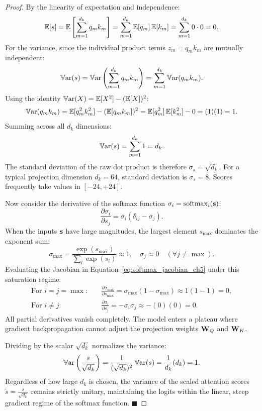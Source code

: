 \documentclass[../../main.tex]{subfiles}
\begin{document}
\begin{proof}
By the linearity of expectation and independence:
\begin{equation}
\operatorname*{\mathbb{E}}[s] = \operatorname*{\mathbb{E}}\left[ \sum_{m=1}^{d_k} q_m k_m \right] = \sum_{m=1}^{d_k} \operatorname*{\mathbb{E}}[q_m] \operatorname*{\mathbb{E}}[k_m] = \sum_{m=1}^{d_k} 0 \cdot 0 = 0.
\end{equation}
For the variance, since the individual product terms $z_m = q_m k_m$ are mutually independent:
\begin{equation}
\operatorname{\mathbb{V}\mathrm{ar}}(s) = \operatorname{\mathbb{V}\mathrm{ar}}\left( \sum_{m=1}^{d_k} q_m k_m \right) = \sum_{m=1}^{d_k} \operatorname{\mathbb{V}\mathrm{ar}}(q_m k_m).
\end{equation}
Using the identity $\operatorname{\mathbb{V}\mathrm{ar}}(X) = \operatorname*{\mathbb{E}}[X^2] - (\operatorname*{\mathbb{E}}[X])^2$:
\begin{equation}
\operatorname{\mathbb{V}\mathrm{ar}}(q_m k_m) = \operatorname*{\mathbb{E}}[q_m^2 k_m^2] - (\operatorname*{\mathbb{E}}[q_m k_m])^2 = \operatorname*{\mathbb{E}}[q_m^2] \operatorname*{\mathbb{E}}[k_m^2] - 0 = (1)(1) = 1.
\end{equation}
Summing across all $d_k$ dimensions:
\begin{equation}
\operatorname{\mathbb{V}\mathrm{ar}}(s) = \sum_{m=1}^{d_k} 1 = d_k.
\end{equation}
The standard deviation of the raw dot product is therefore $\sigma_s = \sqrt{d_k}$. For a typical projection dimension $d_k = 64$, standard deviation is $\sigma_s = 8$. Scores frequently take values in $[-24, +24]$.

Now consider the derivative of the softmax function $\sigma_i = \operatorname{\mathrm{softmax}}_i(\mathbf{s})$:
\begin{equation}
\label{eq:softmax_jacobian_ch5}
\frac{\partial \sigma_i}{\partial s_j} = \sigma_i (\delta_{ij} - \sigma_j).
\end{equation}
When the inputs $\mathbf{s}$ have large magnitudes, the largest element $s_{\max}$ dominates the exponent sum:
\begin{equation}
\sigma_{\max} = \frac{\exp(s_{\max})}{\sum_l \exp(s_l)} \approx 1, \quad \sigma_{j} \approx 0 \quad (\forall j \neq \max).
\end{equation}
Evaluating the Jacobian in Equation~\eqref{eq:softmax_jacobian_ch5} under this saturation regime:
\begin{align}
\text{For } i = j = \max: \quad &\frac{\partial \sigma_{\max}}{\partial s_{\max}} = \sigma_{\max}(1 - \sigma_{\max}) \approx 1(1 - 1) = 0, \\
\text{For } i \neq j: \quad &\frac{\partial \sigma_i}{\partial s_j} = -\sigma_i \sigma_j \approx -(0)(0) = 0.
\end{align}
All partial derivatives vanish completely. The model enters a plateau where gradient backpropagation cannot adjust the projection weights $\mathbf{W}_Q$ and $\mathbf{W}_K$.

Dividing by the scalar $\sqrt{d_k}$ normalizes the variance:
\begin{equation}
\operatorname{\mathbb{V}\mathrm{ar}}\left( \frac{s}{\sqrt{d_k}} \right) = \frac{1}{(\sqrt{d_k})^2} \operatorname{\mathbb{V}\mathrm{ar}}(s) = \frac{1}{d_k} (d_k) = 1.
\end{equation}
Regardless of how large $d_k$ is chosen, the variance of the scaled attention scores $\tilde{s} = \frac{s}{\sqrt{d_k}}$ remains strictly unitary, maintaining the logits within the linear, steep gradient regime of the softmax function. $\blacksquare$
\end{proof}
\end{document}
